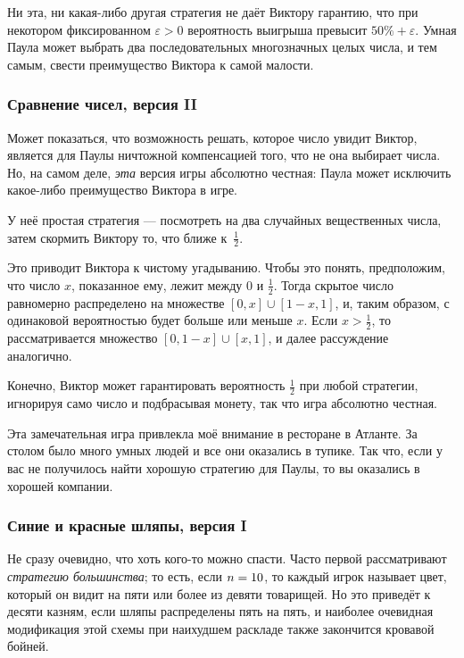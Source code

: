 Ни эта, ни какая-либо другая стратегия не даёт Виктору гарантию, что при некотором фиксированном $\varepsilon>0$ вероятность выигрыша превысит $50\%+\varepsilon$.
Умная Паула может выбрать два последовательных многозначных целых числа, и тем самым, свести преимущество Виктора к самой малости.

\subsubsection*{Сравнение чисел, версия II}%

Может показаться, что возможность решать, которое число увидит Виктор, является для Паулы ничтожной компенсацией того, что не она выбирает числа.
Но, на самом деле, \emph{эта} версия игры абсолютно честная:
Паула может исключить какое-либо преимущество Виктора в игре.

У неё простая стратегия --- посмотреть на два случайных вещественных числа, затем скормить Виктору то, что ближе к~$\tfrac12$.

Это приводит Виктора к чистому угадыванию.
Чтобы это понять, предположим, что число $x$, показанное ему, лежит между $0$ и $\tfrac12$.
Тогда скрытое число равномерно распределено на множестве $[0,x]\cup [1-x, 1]$, и, таким образом, с одинаковой вероятностью будет больше или меньше $x$.
Если $x>\tfrac12$, то рассматривается множество $[0, 1-x]\cup [x, 1]$, и далее рассуждение аналогично.

Конечно, Виктор может гарантировать вероятность $\tfrac12$ при любой стратегии, игнорируя само число и подбрасывая монету, так что игра абсолютно честная.
\heart

Эта замечательная игра привлекла моё внимание в ресторане в Атланте.
За столом было много умных людей и все они оказались в тупике.
Так что, если у вас не получилось найти хорошую стратегию для Паулы, то вы оказались в хорошей компании.

\subsubsection*{Синие и красные шляпы, версия I}%

Не сразу очевидно, что хоть кого-то можно спасти.
Часто первой рассматривают \emph{стратегию большинства};
то есть, если $n\z=10$, то каждый игрок называет цвет, который он видит на пяти или более из девяти товарищей.
Но это приведёт к десяти казням, если шляпы распределены пять на пять, и наиболее очевидная модификация этой схемы при наихудшем раскладе также закончится кровавой бойней.


